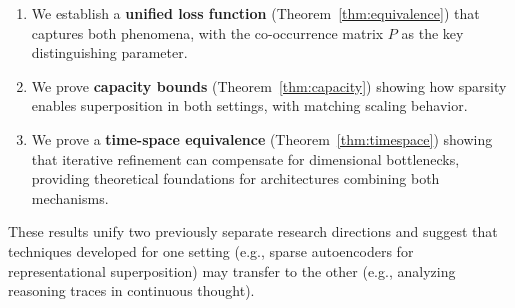 \begin{enumerate}
    \item We establish a \textbf{unified loss function} (Theorem~\ref{thm:equivalence}) that captures both phenomena, with the co-occurrence matrix $P$ as the key distinguishing parameter.

    \item We prove \textbf{capacity bounds} (Theorem~\ref{thm:capacity}) showing how sparsity enables superposition in both settings, with matching scaling behavior.

    \item We prove a \textbf{time-space equivalence} (Theorem~\ref{thm:timespace}) showing that iterative refinement can compensate for dimensional bottlenecks, providing theoretical foundations for architectures combining both mechanisms.
\end{enumerate}

These results unify two previously separate research directions and suggest that techniques developed for one setting (e.g., sparse autoencoders for representational superposition) may transfer to the other (e.g., analyzing reasoning traces in continuous thought).
